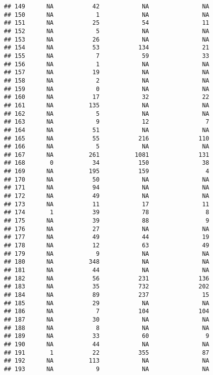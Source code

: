 \documentclass[
  english,
  man]{apa6}
\begin{document}
\begin{verbatim}
## 149      NA           42            NA               NA
## 150      NA            1            NA               NA
## 151      NA           25            54               11
## 152      NA            5            NA               NA
## 153      NA           26            NA               NA
## 154      NA           53           134               21
## 155      NA            7            59               33
## 156      NA            1            NA               NA
## 157      NA           19            NA               NA
## 158      NA            2            NA               NA
## 159      NA            0            NA               NA
## 160      NA           17            32               22
## 161      NA          135            NA               NA
## 162      NA            5            NA               NA
## 163      NA            9            12                7
## 164      NA           51            NA               NA
## 165      NA           55           216              110
## 166      NA            5            NA               NA
## 167      NA          261          1081              131
## 168       0           34           150               38
## 169      NA          195           159                4
## 170      NA           50            NA               NA
## 171      NA           94            NA               NA
## 172      NA           49            NA               NA
## 173      NA           11            17               11
## 174       1           39            78                8
## 175      NA           39            88                9
## 176      NA           27            NA               NA
## 177      NA           49            44               19
## 178      NA           12            63               49
## 179      NA            9            NA               NA
## 180      NA          348            NA               NA
## 181      NA           44            NA               NA
## 182      NA           56           231              136
## 183      NA           35           732              202
## 184      NA           89           237               15
## 185      NA           29            NA               NA
## 186      NA            7           104              104
## 187      NA           30            NA               NA
## 188      NA            8            NA               NA
## 189      NA           33            60                9
## 190      NA           44            NA               NA
## 191       1           22           355               87
## 192      NA          113            NA               NA
## 193      NA            9            NA               NA

\end{verbatim}
\end{document}
